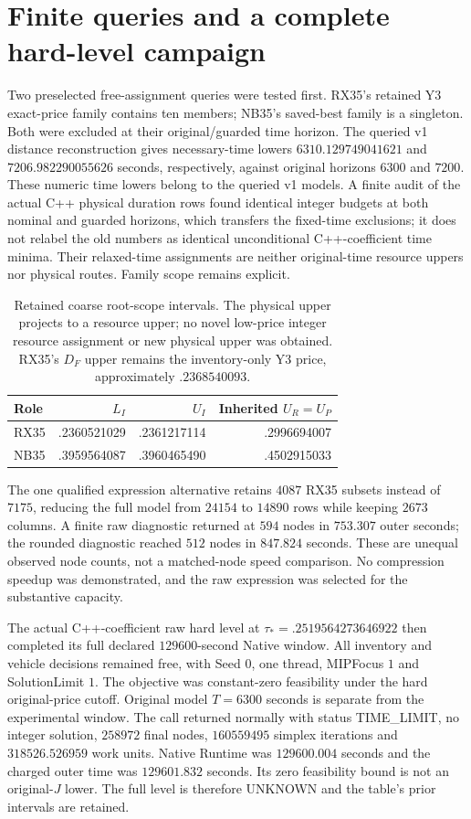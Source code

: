 \section{Finite queries and a complete hard-level campaign}
Two preselected free-assignment queries were tested first. RX35's retained
Y3 exact-price family contains ten members; NB35's saved-best family is a
singleton. Both were excluded at their original/guarded time horizon.
The queried v1 distance reconstruction gives necessary-time lowers
$6310.129749041621$ and $7206.982290055626$ seconds, respectively, against
original horizons $6300$ and $7200$. These numeric time lowers belong to
the queried v1 models. A finite audit of the actual C++ physical duration
rows found identical integer budgets at both nominal and guarded horizons,
which transfers the fixed-time exclusions; it does not relabel the old
numbers as identical unconditional C++-coefficient time minima. Their
relaxed-time assignments are neither original-time resource uppers nor
physical routes. Family scope remains explicit.

\begin{table}[htbp]
\centering
\begin{tabular}{lrrr}
\toprule
Role & $L_I$ & $U_I$ & Inherited $U_R=U_P$\\
\midrule
RX35 & .2360521029 & .2361217114 & .2996694007\\
NB35 & .3959564087 & .3960465490 & .4502915033\\
\bottomrule
\end{tabular}
\caption{Retained coarse root-scope intervals. The physical upper projects
to a resource upper; no novel low-price integer resource assignment or
new physical upper was obtained. RX35's $D_F$ upper remains the
inventory-only Y3 price, approximately $.2368540093$.}
\end{table}

The one qualified expression alternative retains $4087$ RX35 subsets
instead of $7175$, reducing the full model from $24154$ to $14890$ rows
while keeping $2673$ columns. A finite raw diagnostic returned at $594$
nodes in $753.307$ outer seconds; the rounded diagnostic reached $512$
nodes in $847.824$ seconds. These are unequal observed node counts, not a
matched-node speed comparison. No compression speedup was demonstrated,
and the raw expression was selected for the substantive capacity.

The actual C++-coefficient raw hard level at
$\tau_*=.2519564273646922$ then completed its full declared $129600$-second
Native window. All inventory and vehicle decisions remained free, with
Seed $0$, one thread, MIPFocus $1$ and SolutionLimit $1$. The objective was
constant-zero feasibility under the hard original-price cutoff. Original
model $T=6300$ seconds is separate from the experimental window.
The call returned normally with status TIME\_LIMIT, no integer solution,
$258972$ final nodes, $160559495$ simplex iterations and
$318526.526959$ work units. Native Runtime was $129600.004$ seconds and
the charged outer time was $129601.832$ seconds. Its zero feasibility bound
is not an original-$J$ lower. The full level is therefore UNKNOWN and the
table's prior intervals are retained.

